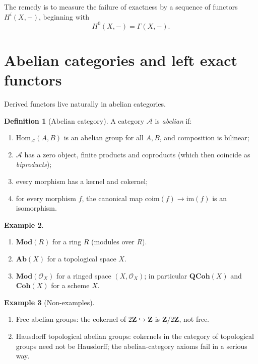\documentclass[11pt]{article}
\theoremstyle{definition}
\newtheorem{definition}{Definition}[section]
\newtheorem{example}[definition]{Example}
\theoremstyle{plain}
\newcommand{\Ab}{\mathbf{Ab}}
\newcommand{\Mod}{\mathbf{Mod}}
\newcommand{\QCoh}{\mathbf{QCoh}}
\newcommand{\Coh}{\mathbf{Coh}}
\newcommand{\Hom}{\mathrm{Hom}}
\newcommand{\OO}{\mathcal{O}}
\newcommand{\ZZ}{\mathbf{Z}}
\begin{document}
The remedy is to measure the failure of exactness by a sequence of functors $H^i(X,-)$, beginning with
\[
H^0(X,-)=\Gamma(X,-).
\]

\section{Abelian categories and left exact functors}

Derived functors live naturally in abelian categories.

\begin{definition}[Abelian category]\label{def:abelian-category}
A category $\mathcal{A}$ is \emph{abelian} if:
\begin{enumerate}[label=(\arabic*)]
\item $\Hom_{\mathcal{A}}(A,B)$ is an abelian group for all $A,B$, and composition is bilinear;
\item $\mathcal{A}$ has a zero object, finite products and coproducts (which then coincide as \emph{biproducts});
\item every morphism has a kernel and cokernel;
\item for every morphism $f$, the canonical map $\mathrm{coim}(f)\to \mathrm{im}(f)$ is an isomorphism.
\end{enumerate}
\end{definition}

\begin{example}
\begin{enumerate}[label=(\alph*)]
\item $\Mod(R)$ for a ring $R$ (modules over $R$).
\item $\Ab(X)$ for a topological space $X$.
\item $\Mod(\OO_X)$ for a ringed space $(X,\OO_X)$; in particular $\QCoh(X)$ and $\Coh(X)$ for a scheme $X$.
\end{enumerate}
\end{example}

\begin{example}[Non-examples]
\begin{enumerate}[label=(\alph*)]
\item Free abelian groups: the cokernel of $2\ZZ\hookrightarrow \ZZ$ is $\ZZ/2\ZZ$, not free.
\item Hausdorff topological abelian groups: cokernels in the category of topological groups need not be Hausdorff; the abelian-category axioms fail in a serious way.
\end{enumerate}
\end{example}
\end{document}
